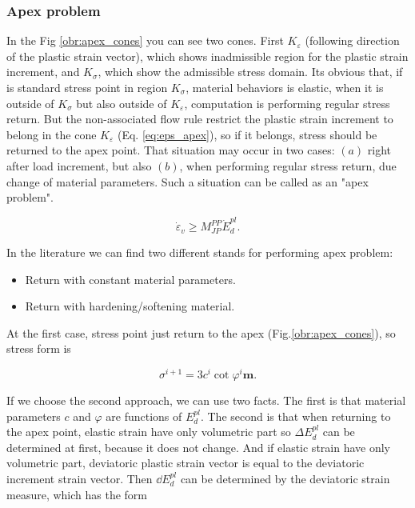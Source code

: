 \subsubsection{Apex problem}
\indent

In the Fig \ref{obr:apex_cones} you can see two cones. First $K_\varepsilon$ (following direction of the plastic strain vector), which shows inadmissible region for the plastic strain increment, and $K_\sigma$, which show the admissible stress domain. Its obvious that, if is standard stress point in region $K_\sigma$, material behaviors is elastic, when it is outside of $K_\sigma$ but also outside of $K_\varepsilon$, computation is performing regular stress return. But the non-associated flow rule restrict the plastic strain increment to belong in the cone $K_\varepsilon$ (Eq. \ref{eq:eps_apex}), so if it belongs, stress should be returned to the apex point. That situation may occur in two cases: $(a)$ right after load increment, but also $(b)$, when performing regular stress return, due change of material parameters. Such a situation can be called as an "apex problem". 

\begin{equation}\label{eq:eps_apex}
	\dot{\varepsilon}_v \geq M_{JP}^{PP} \dot{E}_d^{pl}.
\end{equation}

In the literature we can find two different stands for performing apex problem:

\begin{itemize}
	\item Return with constant material parameters.
	\item Return with hardening/softening material.
\end{itemize}
At the first case, stress point just return to the apex (Fig.\ref{obr:apex_cones}), so stress form is

\begin{equation}\label{eq:sigPL}
	\sigma^{i+1} = 3c^{i} \cot \varphi^{i} \textbf{m}.
\end{equation}

If we choose the second approach, we can use two facts. The first is that material parameters $c$ and $\varphi$ are functions of $E_d^{pl}$. The second is that when returning to the apex point, elastic strain have only volumetric part so $\Delta E_d^{pl}$ can be determined at first, because it does not change. And if elastic strain have only volumetric part, deviatoric plastic strain vector is equal to the deviatoric increment strain vector. Then $\dd E_d^{pl}$ can be determined by the deviatoric strain measure, which has the form

